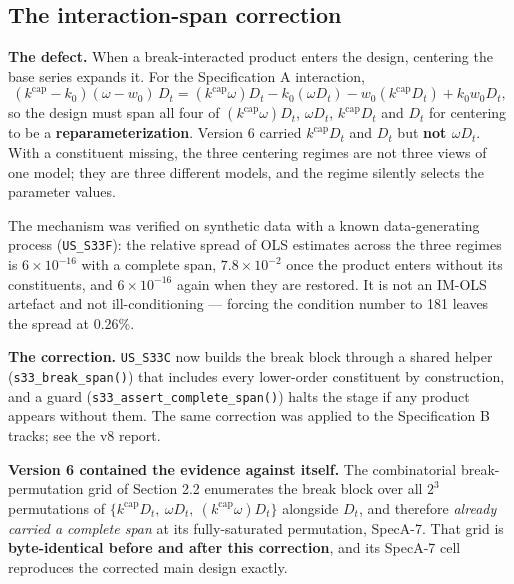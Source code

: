 \documentclass[11pt,a4paper]{article}
\begin{document}
\subsection{The interaction-span correction}

\textbf{The defect.} When a break-interacted product enters the design, centering the base series expands it. For the Specification A interaction,
\begin{equation}
(k^{\text{cap}} - k_0)(\omega - w_0)\, D_t = (k^{\text{cap}} \omega) D_t - k_0 (\omega D_t) - w_0 (k^{\text{cap}} D_t) + k_0 w_0 D_t,
\end{equation}
so the design must span all four of $(k^{\text{cap}}\omega)D_t$, $\omega D_t$, $k^{\text{cap}} D_t$ and $D_t$ for centering to be a \textbf{reparameterization}. Version 6 carried $k^{\text{cap}} D_t$ and $D_t$ but \textbf{not $\omega D_t$}. With a constituent missing, the three centering regimes are not three views of one model; they are three different models, and the regime silently selects the parameter values.

The mechanism was verified on synthetic data with a known data-generating process (\texttt{US\_S33F}): the relative spread of OLS estimates across the three regimes is $6\times10^{-16}$ with a complete span, $7.8\times10^{-2}$ once the product enters without its constituents, and $6\times10^{-16}$ again when they are restored. It is not an IM-OLS artefact and not ill-conditioning --- forcing the condition number to 181 leaves the spread at 0.26\%.

\textbf{The correction.} \texttt{US\_S33C} now builds the break block through a shared helper (\texttt{s33\_break\_span()}) that includes every lower-order constituent by construction, and a guard (\texttt{s33\_assert\_complete\_span()}) halts the stage if any product appears without them. The same correction was applied to the Specification B tracks; see the v8 report.

\textbf{Version 6 contained the evidence against itself.} The combinatorial break-permutation grid of Section 2.2 enumerates the break block over all $2^3$ permutations of $\{k^{\text{cap}}D_t,\ \omega D_t,\ (k^{\text{cap}}\omega)D_t\}$ alongside $D_t$, and therefore \textit{already carried a complete span} at its fully-saturated permutation, SpecA-7. That grid is \textbf{byte-identical before and after this correction}, and its SpecA-7 cell reproduces the corrected main design exactly.
\end{document}
